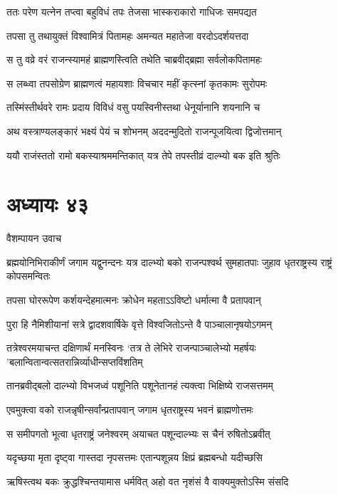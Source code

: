 \twolineshloka
{ततः परेण यत्नेन तप्त्वा बहुविधं तपः}
{तेजसा भास्कराकारो गाधिजः समपद्यत}


\twolineshloka
{तपसा तु तथायुक्तं विश्वामित्रं पितामहः}
{अमन्यत महातेजा वरदोऽदर्शयत्तदा}


\twolineshloka
{स तु वव्रे वरं राजन्स्यामहं ब्राह्मणस्त्विति}
{तथेति चाब्रवीद्ब्रह्मा सर्वलोकपितामहः}


\twolineshloka
{स लब्ध्वा तपसोग्रेण ब्राह्मणत्वं महायशाः}
{विचचार महीं कृत्स्नां कृतकामः सुरोपमः}


\twolineshloka
{तस्मिंस्तीर्थवरे रामः प्रदाय विविधं वसु}
{पयस्विनीस्तथा धेनूर्यानानि शयनानि च}


\twolineshloka
{अथ वस्त्राण्यलङ्कारं भक्ष्यं पेयं च शोभनम्}
{अददन्मुदितो राजन्पूजयित्वा द्विजोत्तमान्}


\twolineshloka
{ययौ राजंस्ततो रामो बकस्याश्रममन्तिकात्}
{यत्र तेपे तपस्तीव्रं दाल्भ्यो बक इति श्रुतिः}


\chapter{अध्यायः ४३}
\twolineshloka
{वैशम्पायन उवाच}
{}


\threelineshloka
{ब्रह्मयोनिभिराकीर्णं जगाम यद्वुनन्दनः}
{यत्र दाल्भ्यो बको राजन्पश्वर्थ सुमहातपाः}
{जुहाव धृतराष्ट्रस्य राष्ट्रं कोपसमन्वितः}


\twolineshloka
{तपसा घोररूपेण कर्शयन्देहमात्मनः}
{क्रोधेन महताऽऽविष्टो धर्मात्मा वै प्रतापवान्}


\twolineshloka
{पुरा हि नैमिशीयानां सत्रे द्वादशवार्षिके}
{वृत्ते विश्वजितोऽन्ते वै पाञ्चालानृषयोऽगमन्}


\threelineshloka
{तत्रेश्वरमयाचन्त दक्षिणार्थं मनस्विनः}
{`तत्र ते लेभिरे राजन्पाञ्चालेभ्यो महर्षयः}
{'बलान्वितान्वत्सतरान्निर्व्याधीन्सप्तविंशतिम्}


\twolineshloka
{तानब्रवीद्बलो दाल्भ्यो विभजध्वं पशूनिति}
{पशूनेतानहं त्यक्त्वा भिक्षिष्ये राजसत्तमम्}


\twolineshloka
{एवमुक्त्वा वको राजन्नृषीन्सर्वांन्प्रतापवान्}
{जगाम धृतराष्ट्रस्य भवनं ब्राह्मणोत्तमः}


\twolineshloka
{स समीपगतो भूत्वा धृतराष्ट्रं जनेश्वरम्}
{अयाचत पशून्दाल्भ्यः स चैनं रुषितोऽब्रवीत्}


\twolineshloka
{यदृच्छया मृता दृष्ट्वा गास्तदा नृपसत्तमः}
{एतान्पशून्नय क्षिप्रं ब्रह्मबन्धो यदीच्छसि}


\twolineshloka
{ऋषिस्त्वथ बकः क्रुद्धश्चिन्तयामास धर्मवित्}
{अहो वत नृशंसं वै वाक्यमुक्तोऽस्मि संसदि}


